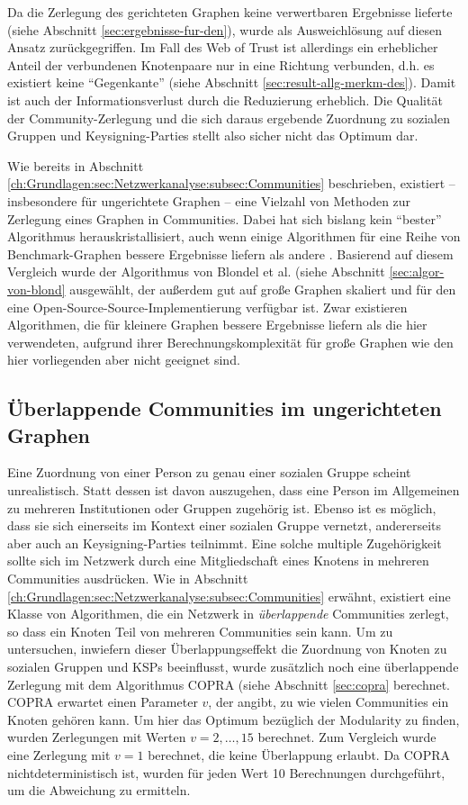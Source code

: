 Da die Zerlegung des gerichteten Graphen keine verwertbaren Ergebnisse
lieferte (siehe Abschnitt \ref{sec:ergebnisse-fur-den}), wurde als
Ausweichlösung auf diesen Ansatz zurückgegriffen.  Im Fall des Web
of Trust ist allerdings ein erheblicher Anteil der verbundenen
Knotenpaare nur in eine Richtung verbunden, d.h. es existiert keine
``Gegenkante'' (siehe Abschnitt
\ref{sec:result-allg-merkm-des}). Damit ist auch der
Informationsverlust durch die Reduzierung erheblich. Die Qualität
der Community-Zerlegung und die sich daraus ergebende Zuordnung zu
sozialen Gruppen und Keysigning-Parties stellt also sicher nicht das
Optimum dar.

Wie bereits in Abschnitt
\ref{ch:Grundlagen:sec:Netzwerkanalyse:subsec:Communities}
beschrieben, existiert -- insbesondere für ungerichtete Graphen --
eine Vielzahl von Methoden zur Zerlegung eines Graphen in
Communities. Dabei hat sich bislang kein ``bester'' Algorithmus
herauskristallisiert, auch wenn einige Algorithmen für eine Reihe
von Benchmark-Graphen bessere Ergebnisse liefern als andere
\cite{Lancichinetti2009}. Basierend auf diesem Vergleich wurde der
Algorithmus von Blondel et al. (siehe Abschnitt
\ref{sec:algor-von-blond} ausgewählt, der außerdem gut auf große
Graphen skaliert und für den eine Open-Source-Source-Implementierung
verfügbar ist.  Zwar existieren Algorithmen, die für kleinere
Graphen bessere Ergebnisse liefern als die hier verwendeten, aufgrund
ihrer Berechnungskomplexität für große Graphen wie den hier
vorliegenden aber nicht geeignet sind.

\subsection{Überlappende Communities im ungerichteten Graphen}
\label{sec:uberl-comm-unger}

Eine Zuordnung von einer Person zu genau einer sozialen Gruppe scheint
unrealistisch. Statt dessen ist davon auszugehen, dass eine Person im
Allgemeinen zu mehreren Institutionen oder Gruppen zugehörig
ist. Ebenso ist es möglich, dass sie sich einerseits im Kontext einer
sozialen Gruppe vernetzt, andererseits aber auch an Keysigning-Parties
teilnimmt. Eine solche multiple Zugehörigkeit sollte sich im Netzwerk
durch eine Mitgliedschaft eines Knotens in mehreren Communities
ausdrücken. Wie in Abschnitt
\ref{ch:Grundlagen:sec:Netzwerkanalyse:subsec:Communities} erwähnt,
existiert eine Klasse von Algorithmen, die ein Netzwerk in
\emph{überlappende} Communities zerlegt, so dass ein Knoten Teil von
mehreren Communities sein kann. Um zu untersuchen, inwiefern dieser
Überlappungseffekt die Zuordnung von Knoten zu sozialen Gruppen und
KSPs beeinflusst, wurde zusätzlich noch eine überlappende Zerlegung
mit dem Algorithmus COPRA (siehe Abschnitt \ref{sec:copra}
berechnet. COPRA erwartet einen Parameter $v$, der angibt, zu wie
vielen Communities ein Knoten gehören kann. Um hier das Optimum
bezüglich der Modularity zu finden, wurden Zerlegungen mit Werten
$v=2, \dots, 15$ berechnet. Zum Vergleich wurde eine Zerlegung mit
$v=1$ berechnet, die keine Überlappung erlaubt. Da COPRA
nichtdeterministisch ist, wurden für jeden Wert 10 Berechnungen
durchgeführt, um die Abweichung zu ermitteln.



